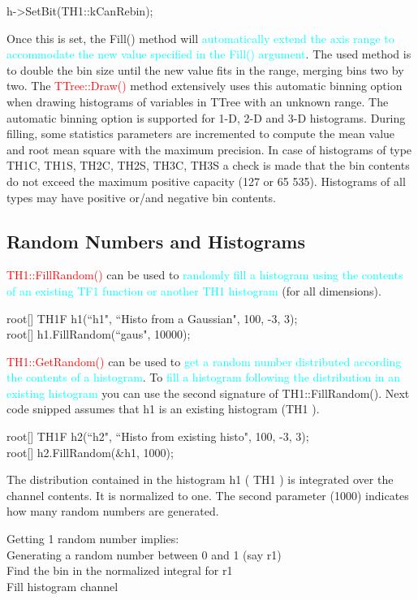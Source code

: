 \documentclass[12pt,a4paper]{article}
\begin{document}
h->SetBit(TH1::kCanRebin);

Once this is set, the Fill() method will \textcolor{cyan}{automatically extend the axis range to accommodate the new value specified in the Fill() argument}. The used method is to double the bin size until the new value fits in the range, merging bins two by two. The \textcolor{red}{TTree::Draw()} method extensively uses this automatic binning option when drawing histograms of variables in TTree with an unknown range. The automatic binning option is supported for 1-D, 2-D and 3-D histograms. During filling, some statistics parameters are incremented to compute the mean value and root mean square with the maximum precision. In case of histograms of type TH1C, TH1S, TH2C, TH2S, TH3C, TH3S a check is made that the bin contents do not exceed the maximum positive capacity (127 or 65 535). Histograms of all types may have positive or/and negative bin contents.

\subsection{Random Numbers and Histograms}
\textcolor{red}{TH1::FillRandom()} can be used to \textcolor{cyan}{randomly fill a histogram using the contents of an existing TF1 function or another TH1 histogram} (for all dimensions).

root[] TH1F h1(``h1", ``Histo from a Gaussian", 100, -3, 3); \\
root[] h1.FillRandom(``gaus", 10000);

\textcolor{red}{TH1::GetRandom()} can be used to \textcolor{cyan}{get a random number distributed according the contents of a histogram}. To \textcolor{cyan}{fill a histogram following the distribution in an existing histogram} you can use the second signature of TH1::FillRandom(). Next code snipped assumes that h1 is an existing histogram (TH1 ).

root[] TH1F h2(``h2", ``Histo from existing histo", 100, -3, 3); \\
root[] h2.FillRandom($\&$h1, 1000);

The distribution contained in the histogram h1 ( TH1 ) is integrated over the channel contents. It is normalized to one. The second parameter (1000) indicates how many random numbers are generated.

Getting 1 random number implies: \\
Generating a random number between 0 and 1 (say r1) \\
Find the bin in the normalized integral for r1 \\
Fill histogram channel
\end{document}
